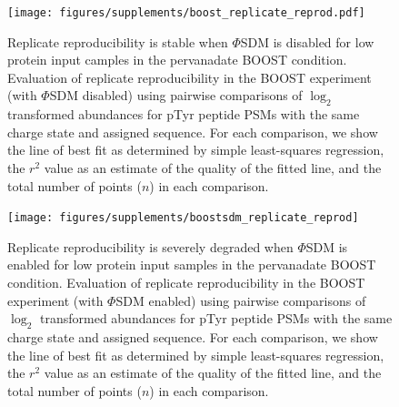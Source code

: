 \documentclass[journal=jprobs,manuscript=article]{achemso}
\begin{document}
\clearpage

\begin{figure}[!t]
\centering
\texttt{[image: figures/supplements/boost\_replicate\_reprod.pdf]}
\caption{Replicate reproducibility is stable when $\Phi$SDM is disabled for low protein input camples in the pervanadate BOOST condition. Evaluation of replicate reproducibility in the BOOST experiment (with $\Phi$SDM disabled) using pairwise comparisons of $\log_2$ transformed abundances for pTyr peptide PSMs with the same charge state and assigned sequence. For each comparison, we show the line of best fit as determined by simple least-squares regression\cite{grus2019data}, the $r^2$ value as an estimate of the quality of the fitted line, and the total number of points ($n$) in each comparison.}\label{boost_replicate_reprod}
\end{figure}

\clearpage

\begin{figure}[t!]
\centering
\texttt{[image: figures/supplements/boostsdm\_replicate\_reprod]}
\caption{Replicate reproducibility is severely degraded when $\Phi$SDM is enabled for low protein input samples in the pervanadate BOOST condition. Evaluation of replicate reproducibility in the BOOST experiment (with $\Phi$SDM enabled) using pairwise comparisons of $\log_2$ transformed abundances for  pTyr peptide PSMs with the same charge state and assigned sequence. For each comparison, we show the line of best fit as determined by simple least-squares regression\cite{grus2019data}, the $r^2$ value as an estimate of the quality of the fitted line, and the total number of points ($n$) in each comparison. }\label{boostsdm_replicate_reprod}
\end{figure}

\clearpage
\end{document}
